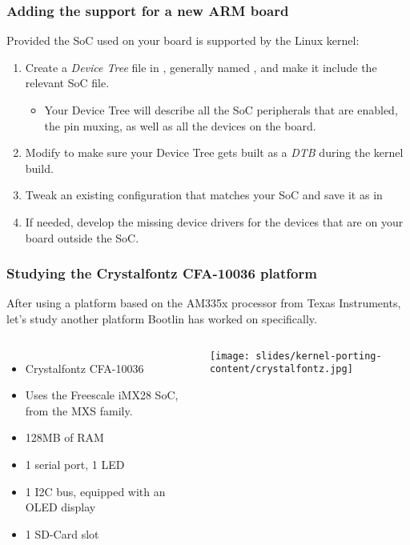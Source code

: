 \begin{frame}
  \frametitle{Adding the support for a new ARM board}
  Provided the SoC used on your board is supported by the Linux kernel:
  \begin{enumerate}
  \item Create a {\em Device Tree} file in ,
    generally named , and make it
    include the relevant SoC  file.
    \begin{itemize}
    \item Your Device Tree will describe all the SoC peripherals that
      are enabled, the pin muxing, as well as all the devices on the
      board.
    \end{itemize}
  \item Modify  to make sure your
    Device Tree gets built as a {\em DTB} during the kernel build.
  \item Tweak an existing configuration that matches your SoC and save
    it as  in 
  \item If needed, develop the missing device drivers for the devices
    that are on your board outside the SoC.
  \end{enumerate}
\end{frame}

\begin{frame}
  \frametitle{Studying the Crystalfontz CFA-10036 platform}
  After using a platform based on the AM335x processor from Texas
  Instruments, let's study another platform Bootlin
  has worked on specifically.
  \begin{columns}
    \begin{itemize}
    \item Crystalfontz CFA-10036
    \item Uses the Freescale iMX28 SoC, from the MXS family.
    \item 128MB of RAM
    \item 1 serial port, 1 LED
    \item 1 I2C bus, equipped with an OLED display
    \item 1 SD-Card slot
    \end{itemize}
    \texttt{[image: slides/kernel-porting-content/crystalfontz.jpg]}
  \end{columns}
\end{frame}

